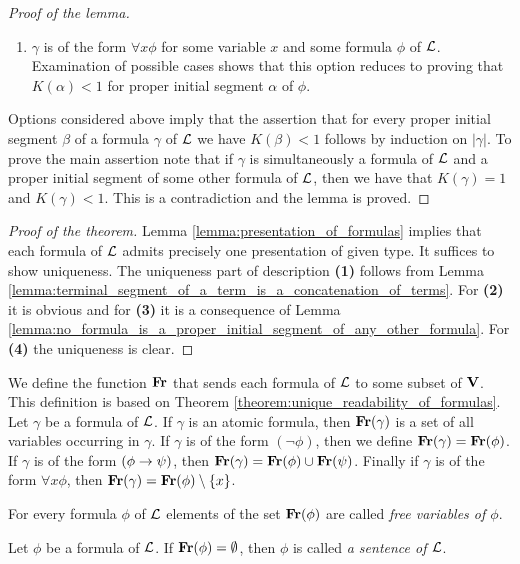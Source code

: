 \documentclass[10pt]{amsart}
\begin{document}
\begin{proof}[Proof of the lemma]
\begin{enumerate}[label=\textbf{(\arabic*)}, leftmargin=3.0em]
		\item $\gamma$ is of the form $\forall x \phi$ for some variable $x$ and some formula $\phi$ of ${\mathcal L}$. Examination of possible cases shows that this option reduces to proving that $K(\alpha) < 1$ for proper initial segment $\alpha$ of $\phi$.
	\end{enumerate}
	Options considered above imply that the assertion that for every proper initial segment $\beta$ of a formula $\gamma$ of ${\mathcal L}$ we have $K(\beta) < 1$ follows by induction on $|\gamma|$. To prove the main assertion note that if $\gamma$ is simultaneously a formula of ${\mathcal L}$ and a proper initial segment of some other formula of ${\mathcal L}$, then we have that $K(\gamma) = 1$ and $K(\gamma) < 1$. This is a contradiction and the lemma is proved.
\end{proof}

\begin{proof}[Proof of the theorem]
	Lemma \ref{lemma:presentation_of_formulas} implies that each formula of ${\mathcal L}$ admits precisely one presentation of given type. It suffices to show uniqueness. The uniqueness part of description \textbf{(1)} follows from Lemma \ref{lemma:terminal_segment_of_a_term_is_a_concatenation_of_terms}. For \textbf{(2)} it is obvious and for \textbf{(3)} it is a consequence of Lemma \ref{lemma:no_formula_is_a_proper_initial_segment_of_any_other_formula}. For \textbf{(4)} the uniqueness is clear.
\end{proof}
\noindent
We define the function $\mathbf{Fr}$ that sends each formula of ${\mathcal L}$ to some subset of $\mathbf{V}$. This definition is based on Theorem \ref{theorem:unique_readability_of_formulas}. Let $\gamma$ be a formula of ${\mathcal L}$. If $\gamma$ is an atomic formula, then $\mathbf{Fr}(\gamma)$ is a set of all variables occurring in $\gamma$. If $\gamma$ is of the form $(\neg \phi)$, then we define $\mathbf{Fr}(\gamma) = \mathbf{Fr}(\phi)$. If $\gamma$ is of the form $(\phi \rightarrow \psi)$, then $\mathbf{Fr}(\gamma) = \mathbf{Fr}(\phi)\cup \mathbf{Fr}(\psi)$. Finally if $\gamma$ is of the form $\forall x\phi$, then $\mathbf{Fr}(\gamma) = \mathbf{Fr}(\phi) \setminus \{x\}$.

\begin{definition}
	For every formula $\phi$ of ${\mathcal L}$ elements of the set $\mathbf{Fr}(\phi)$ are called \textit{free variables of $\phi$}.
\end{definition}

\begin{definition}
	Let $\phi$ be a formula of ${\mathcal L}$. If $\mathbf{Fr}(\phi)=\emptyset$, then $\phi$ is called \textit{a sentence of ${\mathcal L}$}.
\end{definition}
\end{document}
